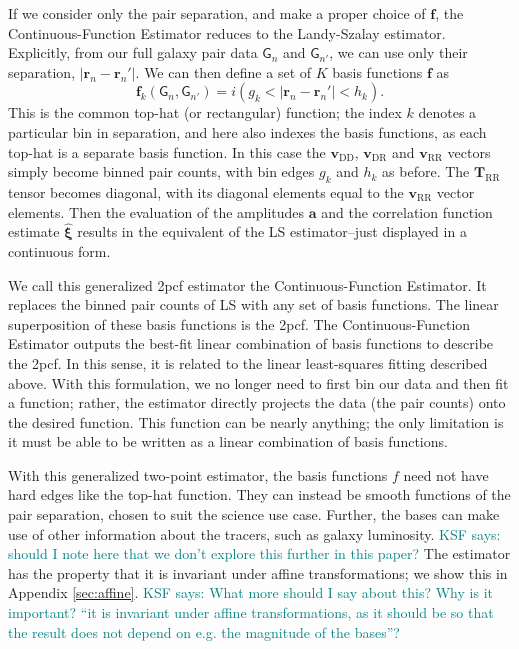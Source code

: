 \documentclass[modern]{aastex62}
\newcommand{\cf}{2pcf\xspace} %
\newcommand{\Est}{The Continuous-Function Estimator\xspace}
\newcommand{\est}{the Continuous-Function Estimator\xspace}
\newcommand{\LS}{LS\xspace}
\newcommand{\bld}[1]{\bm{#1}} %
\newcommand{\vv}[1]{\bld{v}_\mathrm{#1}}
\newcommand{\TT}[1]{\bld{T}_\mathrm{#1}}
\newcommand{\ff}{\bld{f}}
\newcommand{\GG}[1]{\mathsf{G}_{#1}}
\newcommand{\KSF}[1]{\textcolor{teal}{KSF says: #1}}
\begin{document}
If we consider only the pair separation, and make a proper choice of $\ff$, \est reduces to the Landy-Szalay estimator.
Explicitly, from our full galaxy pair data $\GG{n}$ and $\GG{n'}$, we can use only their separation,  $|\bld{r}_n - \bld{r}_n'|$.
We can then define a set of $K$ basis functions $\ff$ as
\begin{equation}
\ff_k(\GG{n}, \GG{n'}) =  i(g_k < |\bld{r}_n - \bld{r}_n'| < h_k).
\end{equation}
This is the common top-hat (or rectangular) function; the index $k$ denotes a particular bin in separation, and here also indexes the basis functions, as each top-hat is a separate basis function.
In this case the $\vv{DD}$, $\vv{DR}$ and $\vv{RR}$ vectors simply become binned pair counts, with bin edges $g_k$ and $h_k$ as before.
The $\TT{RR}$ tensor becomes diagonal, with its diagonal elements equal to the $\vv{RR}$ vector elements.
Then the evaluation of the amplitudes $\bld{a}$ and the correlation function estimate $\bld{\hat{\xi}}$ results in the equivalent of the \LS estimator--just displayed in a continuous form.

We call this generalized \cf estimator \est.
It replaces the binned pair counts of \LS with any set of basis functions. 
The linear superposition of these basis functions is the \cf.
\Est outputs the best-fit linear combination of basis functions to describe the \cf.
In this sense, it is related to the linear least-squares fitting described above.
With this formulation, we no longer need to first bin our data and then fit a function; rather, the estimator directly projects the data (the pair counts) onto the desired function.
This function can be nearly anything; the only limitation is it must be able to be written as a linear combination of basis functions.

With this generalized two-point estimator, the basis functions $f$ need not have hard edges like the top-hat function.
They can instead be smooth functions of the pair separation, chosen to suit the science use case.
Further, the bases can make use of other information about the tracers, such as galaxy luminosity.
\KSF{should I note here that we don't explore this further in this paper?}
The estimator has the property that it is invariant under affine transformations; we show this in Appendix \ref{sec:affine}. \KSF{What more should I say about this? Why is it important? ``it is invariant under affine transformations, as it should be so that the result does not depend on e.g. the magnitude of the bases''?}
\end{document}
